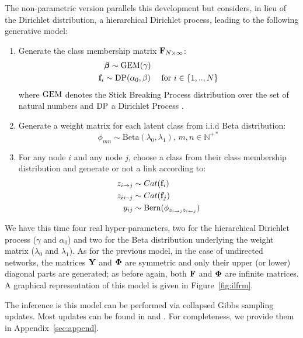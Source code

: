 The non-parametric version parallels this development but considers, in lieu of the Dirichlet distribution, a hierarchical Dirichlet process, leading to the following generative model:
%
\begin{enumerate}
\item Generate the class membership matrix $\mathbf{F}_{N \times \infty}$:
   \begin{align}
    &\bm{\beta} \sim \mathrm{GEM}(\gamma) \nonumber \\
    \mathbf{f}_i &\sim \mathrm{DP}(\alpha_0, \beta) \quad\textnormal{ for }  i \in \{1, .., N\} \nonumber
   \end{align}
where $\mathrm{GEM}$ denotes the Stick Breaking Process distribution over the set of natural numbers and $\mathrm{DP}$ a Dirichlet Process  \cite{HDP}.
\item Generate a weight matrix for each latent class from i.i.d Beta distribution:\\
\[ \phi_{mn} \sim \mathrm{Beta}(\lambda_0,\lambda_1), \, m,n \in \mathbb{N}^{+*} \]
\item For any node $i$ and any node $j$, choose a class from their class membership distribution and generate or not a link according to:
   \begin{align}
    z_{i \rightarrow j} &\sim \mbox{Cat}(\mat{f}_i) \nonumber \\
    z_{i \leftarrow j} &\sim \mbox{Cat}(\mat{f}_j) \nonumber \\
    y_{ij} &\sim \mathrm{Bern}(\phi_{z_{i \rightarrow j}z_{i \leftarrow j}})
    \label{eq:link-immsb}
   \end{align}
\end{enumerate}
%
We have this time four real hyper-parameters, two for the hierarchical Dirichlet process ($\gamma$ and $\alpha_0$) and two for the Beta distribution underlying the weight matrix ($\lambda_0$ and $\lambda_1$). As for the previous model, in the case of undirected networks, the matrices $\mathbf{Y}$ and $\mathbf{\Phi}$ are symmetric and only their upper (or lower) diagonal parts are generated; as before again, both $\mathbf{F}$ and $\mathbf{\Phi}$ are infinite matrices. A graphical representation of this model is given in Figure~\ref{fig:ilfrm}.

The inference is this model can be performed via collapsed Gibbs sampling updates. Most updates can be found in \cite{HDP} and \cite{diMMSB}. For completeness, we provide them in Appendix~\ref{sec:append}.

